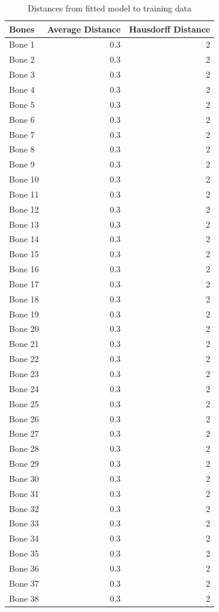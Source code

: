 \iffalse
\begin{table}
\centering
\caption{Distances from fitted model to training data}
\label{tbl:registration_distance}
\begin{tabular}{lrr}
\toprule
\textbf{Bones} &
Average Distance &
Hausdorff Distance \\
\midrule
Bone 1& 0.3 & 2 \\
Bone 2& 0.3 & 2 \\
Bone 3& 0.3 & 2 \\
Bone 4& 0.3 & 2 \\
Bone 5& 0.3 & 2 \\
Bone 6& 0.3 & 2 \\
Bone 7& 0.3 & 2 \\
Bone 8& 0.3 & 2 \\
Bone 9& 0.3 & 2 \\
Bone 10& 0.3 & 2 \\
Bone 11& 0.3 & 2 \\
Bone 12& 0.3 & 2 \\
Bone 13& 0.3 & 2 \\
Bone 14& 0.3 & 2 \\
Bone 15& 0.3 & 2 \\
Bone 16& 0.3 & 2 \\
Bone 17& 0.3 & 2 \\
Bone 18& 0.3 & 2 \\
Bone 19& 0.3 & 2 \\
Bone 20& 0.3 & 2 \\
Bone 21& 0.3 & 2 \\
Bone 22& 0.3 & 2 \\
Bone 23& 0.3 & 2 \\
Bone 24& 0.3 & 2 \\
Bone 25& 0.3 & 2 \\
Bone 26& 0.3 & 2 \\
Bone 27& 0.3 & 2 \\
Bone 28& 0.3 & 2 \\
Bone 29& 0.3 & 2 \\
Bone 30& 0.3 & 2 \\
Bone 31& 0.3 & 2 \\
Bone 32& 0.3 & 2 \\
Bone 33& 0.3 & 2 \\
Bone 34& 0.3 & 2 \\
Bone 35& 0.3 & 2 \\
Bone 36& 0.3 & 2 \\
Bone 37& 0.3 & 2 \\
Bone 38& 0.3 & 2 \\

\end{tabular}
\end{table}
